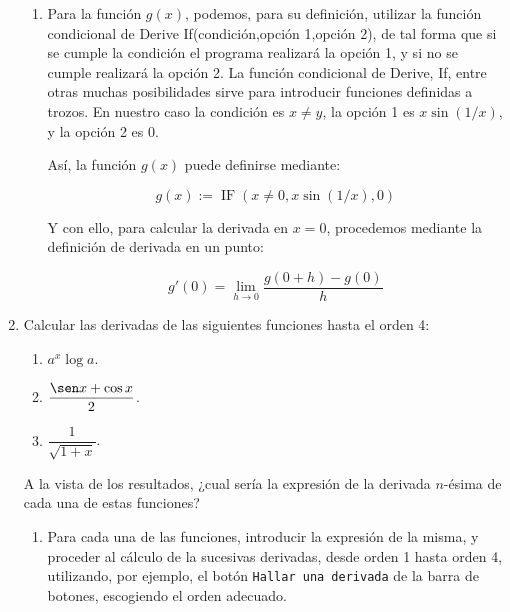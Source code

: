 \begin{enumerate}[leftmargin=*]
\begin{indication}
{\begin{enumerate}
\[
f'(1) = \mathop {\lim }\limits_{h \to 0} \frac{{f(1 + h) - f(1)}}
{h}
\]

\item Para la función $g(x)$, podemos, para su definición,
utilizar la función condicional de Derive
\textsf{If(condición,opción 1,opción 2)}, de tal forma que si se
cumple la \textsf{condición} el programa realizará la
\textsf{opción 1}, y si no se cumple realizará la \textsf{opción
2}. La función condicional de Derive, \textsf{If}, entre otras
muchas posibilidades sirve para introducir funciones definidas a
trozos. En nuestro caso la \textsf{condición} es $x\neq y$, la
\textsf{opción 1} es $x\sin(1/x)$, y la \textsf{opción 2} es $0$.

Así, la función $g(x)$ puede definirse mediante:

\[
g(x):=\operatorname{IF}(x\neq0,x\sin(1/x),0)
\]


Y con ello, para calcular la derivada en $x=0$, procedemos
mediante la definición de derivada en un punto:


\[
g'(0) = \mathop {\lim }\limits_{h \to 0} \frac{{g(0 + h) - g(0)}}
{h} 
\]



\end{enumerate}
}
\end{indication}


\item  Calcular las derivadas de las siguientes funciones hasta el
orden 4:

\begin{enumerate}
\item  $a^x\log a$.

\item  $\dfrac{\sen x +\cos x}{2}$.

\item  $\dfrac{1}{\sqrt{1+x}}$.
\end{enumerate}

A la vista de los resultados, ¿cual sería la expresión de la
derivada $n$-ésima de cada una de estas funciones?

\begin{indication}
{
\begin{enumerate}
\item Para cada una de las funciones, introducir la expresión de
la misma, y proceder al cálculo de la sucesivas derivadas, desde
orden 1 hasta orden 4, utilizando, por ejemplo, el botón
\texttt{Hallar una derivada} de la barra de botones, escogiendo el
orden adecuado.


\end{enumerate}}
\end{indication}
\end{enumerate}
